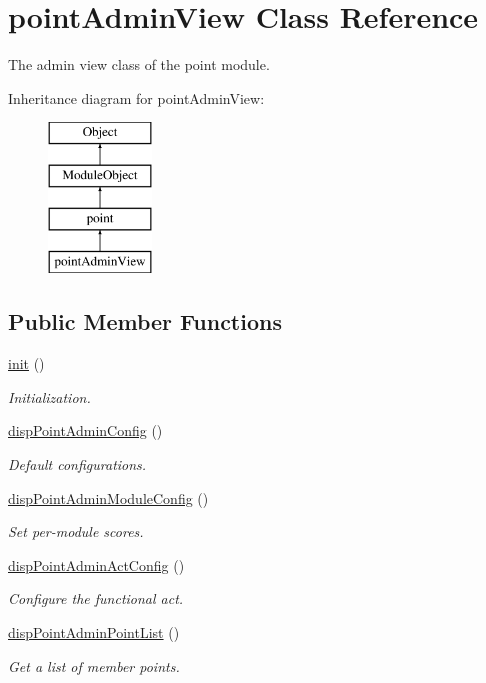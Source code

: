 \hypertarget{classpointAdminView}{}\section{point\+Admin\+View Class Reference}
\label{classpointAdminView}


The admin view class of the point module.  


Inheritance diagram for point\+Admin\+View\+:\begin{figure}[H]
\begin{center}
\leavevmode
\includegraphics[height=4.000000cm]{classpointAdminView}
\end{center}
\end{figure}
\subsection*{Public Member Functions}
\begin{DoxyCompactItemize}
\item 
\hyperlink{classpointAdminView_a0e6e7f367fbb84b3f4e6f95e838c2b50}{init} ()
\begin{DoxyCompactList}\small\item\em Initialization. \end{DoxyCompactList}\item 
\hyperlink{classpointAdminView_a5e73a90049fb98faea8d3074c513da31}{disp\+Point\+Admin\+Config} ()
\begin{DoxyCompactList}\small\item\em Default configurations. \end{DoxyCompactList}\item 
\hyperlink{classpointAdminView_a3f1014ab2fef5e38542e6e38a921bc6e}{disp\+Point\+Admin\+Module\+Config} ()
\begin{DoxyCompactList}\small\item\em Set per-\/module scores. \end{DoxyCompactList}\item 
\hyperlink{classpointAdminView_a26806618247648a89db0c1af0a02918e}{disp\+Point\+Admin\+Act\+Config} ()
\begin{DoxyCompactList}\small\item\em Configure the functional act. \end{DoxyCompactList}\item 
\hyperlink{classpointAdminView_af4d324fe8612263a3fa6183bf06a5053}{disp\+Point\+Admin\+Point\+List} ()
\begin{DoxyCompactList}\small\item\em Get a list of member points. \end{DoxyCompactList}\end{DoxyCompactItemize}
